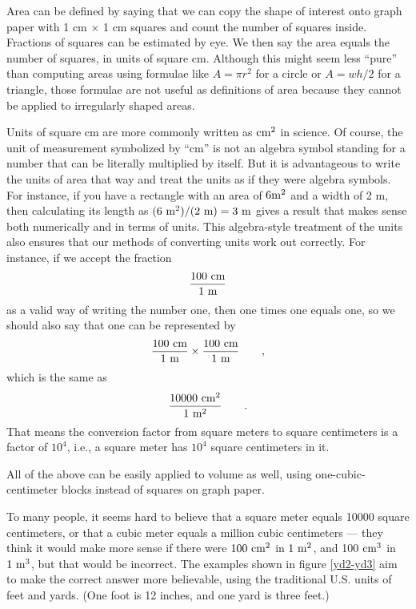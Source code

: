 Area can be defined by saying that we can copy the shape of
interest onto graph paper with 1 cm $\times$ 1 cm squares and
count the number of squares inside. Fractions of squares can
be estimated by eye. We then say the area equals the number
of squares, in units of square cm. Although this might seem
less ``pure'' than computing areas using formulae like
$A=\pi r^2$ for a circle or $A=wh/2$ for a triangle,
those formulae are not useful as definitions of area because
they cannot be applied to irregularly shaped areas.

Units of square cm are more commonly written as $\textup{cm}^2$ in
science. Of course, the unit of measurement symbolized by
``cm'' is not an algebra symbol standing for a number that
can be literally multiplied by itself. But it is advantageous
to write the units of area that way and treat the units as
if they were algebra symbols. For instance, if you have a
rectangle with an area of $6 \textup{m}^2$ and a width of 2 m, then
calculating its length as $(6\ \munit^2)/(2\ \munit)=3\ \munit$ gives a result
that makes sense both numerically and in terms of units.
This algebra-style treatment of the units also ensures that
our methods of converting units work out correctly. For
instance, if we accept the fraction
\begin{equation*}
 \frac{100\ \textup{cm}}{1\ \textup{m}}
\end{equation*}
as a valid way of writing the number one, then one times one
equals one, so we should also say that one can be represented by
\begin{equation*}
 \frac{100\ \zu{cm}}{1\ \munit} \times \frac{100\ \zu{cm}}{1\ \munit} \qquad ,
\end{equation*}
which is the same as
\begin{equation*}
 \frac{10000\ \textup{cm}^2}{1\ \textup{m}^2} \qquad .
\end{equation*}
That means the conversion factor from square meters to
square centimeters is a factor of $10^4$, i.e., a square
meter has $10^4$ square centimeters in it.

All of the above can be easily applied to volume as well,
using one-cubic-centimeter blocks instead of squares on graph paper.

To many people, it seems hard to believe that a square meter
equals 10000 square centimeters, or that a cubic meter
equals a million cubic centimeters --- they think it would
make more sense if there were $100\ \textup{cm}^2$ in $1\ \textup{m}^2$, and 100
$\textup{cm}^3$ in $1\ \munit^3$, but that would be incorrect. The examples
shown in figure \ref{yd2-yd3} aim to make the correct answer
more believable, using the traditional U.S. units of feet
and yards. (One foot is 12 inches, and one yard is three feet.)

